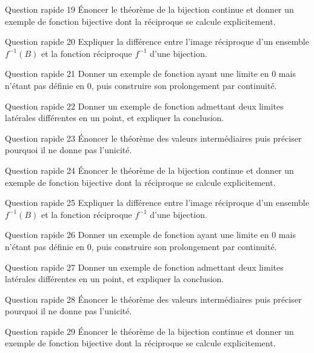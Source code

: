 \documentclass[11pt,a4paper]{article}
\begin{document}
\begin{exobox}{Question rapide 19}
Énoncer le théorème de la bijection continue et donner un exemple de fonction bijective dont la réciproque se calcule explicitement.
\end{exobox}
\begin{exobox}{Question rapide 20}
Expliquer la différence entre l'image réciproque d'un ensemble $f^{-1}(B)$ et la fonction réciproque $f^{-1}$ d'une bijection.
\end{exobox}
\begin{exobox}{Question rapide 21}
Donner un exemple de fonction ayant une limite en $0$ mais n'étant pas définie en $0$, puis construire son prolongement par continuité.
\end{exobox}
\begin{exobox}{Question rapide 22}
Donner un exemple de fonction admettant deux limites latérales différentes en un point, et expliquer la conclusion.
\end{exobox}
\begin{exobox}{Question rapide 23}
Énoncer le théorème des valeurs intermédiaires puis préciser pourquoi il ne donne pas l'unicité.
\end{exobox}
\begin{exobox}{Question rapide 24}
Énoncer le théorème de la bijection continue et donner un exemple de fonction bijective dont la réciproque se calcule explicitement.
\end{exobox}
\begin{exobox}{Question rapide 25}
Expliquer la différence entre l'image réciproque d'un ensemble $f^{-1}(B)$ et la fonction réciproque $f^{-1}$ d'une bijection.
\end{exobox}
\begin{exobox}{Question rapide 26}
Donner un exemple de fonction ayant une limite en $0$ mais n'étant pas définie en $0$, puis construire son prolongement par continuité.
\end{exobox}
\begin{exobox}{Question rapide 27}
Donner un exemple de fonction admettant deux limites latérales différentes en un point, et expliquer la conclusion.
\end{exobox}
\begin{exobox}{Question rapide 28}
Énoncer le théorème des valeurs intermédiaires puis préciser pourquoi il ne donne pas l'unicité.
\end{exobox}
\begin{exobox}{Question rapide 29}
Énoncer le théorème de la bijection continue et donner un exemple de fonction bijective dont la réciproque se calcule explicitement.
\end{exobox}
\end{document}
